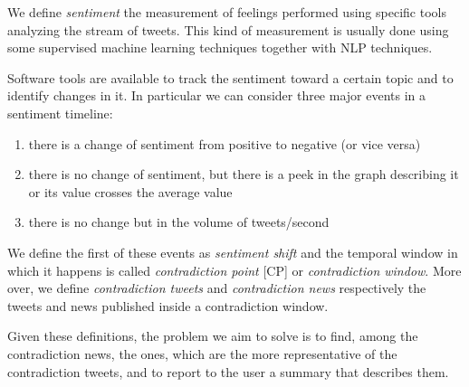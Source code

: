 We define \emph{sentiment} the measurement of feelings performed using specific tools analyzing the stream of tweets.
This kind of measurement is usually done using some supervised machine learning techniques together with NLP techniques.

Software tools are available to track the sentiment toward a certain topic and to identify changes in it. In particular we can consider three major events in a sentiment timeline:

\begin{enumerate}
	\item there is a change of sentiment from positive to negative (or
		vice versa)
	\item there is no change of sentiment, but there is a peek in the graph
		describing it or its value crosses the average value
	\item there is no change but in the volume of tweets/second
\end{enumerate}

We define the first of these events as \emph{sentiment shift} and the temporal window in which it happens is called \emph{contradiction point} [CP] or \emph{contradiction window}. 
More over, we define \emph{contradiction tweets} and \emph{contradiction news} respectively the tweets and news published inside a contradiction window.

Given these definitions, the problem we aim to solve is to find, among the contradiction news, the ones, which are the more representative of the contradiction tweets, and to report to the user a summary that describes them.
